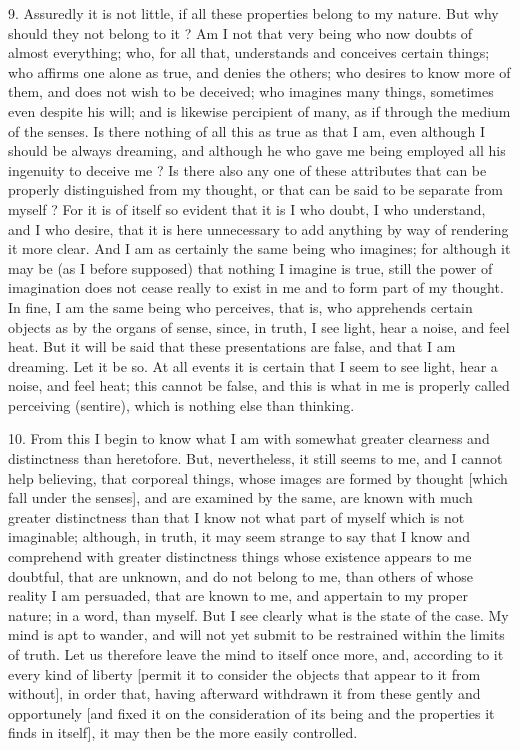 9. Assuredly it is not little, if all these properties belong to my nature. But why should they not belong to it ? Am I not that very being who now doubts of almost everything; who, for all that, understands and conceives certain things; who affirms one alone as true, and denies the others; who desires to know more of them, and does not wish to be deceived; who imagines many things, sometimes even despite his will; and is likewise percipient of many, as if through the medium of the senses. Is there nothing of all this as true as that I am, even although I should be always dreaming, and although he who gave me being employed all his ingenuity to deceive me ? Is there also any one of these attributes that can be properly distinguished from my thought, or that can be said to be separate from myself ? For it is of itself so evident that it is I who doubt, I who understand, and I who desire, that it is here unnecessary to add anything by way of rendering it more clear. And I am as certainly the same being who imagines; for although it may be (as I before supposed) that nothing I imagine is true, still the power of imagination does not cease really to exist in me and to form part of my thought. In fine, I am the same being who perceives, that is, who apprehends certain objects as by the organs of sense, since, in truth, I see light, hear a noise, and feel heat. But it will be said that these presentations are false, and that I am dreaming. Let it be so. At all events it is certain that I seem to see light, hear a noise, and feel heat; this cannot be false, and this is what in me is properly called perceiving (sentire), which is nothing else than thinking.

10. From this I begin to know what I am with somewhat greater clearness and distinctness than heretofore. But, nevertheless, it still seems to me, and I cannot help believing, that corporeal things, whose images are formed by thought [which fall under the senses], and are examined by the same, are known with much greater distinctness than that I know not what part of myself which is not imaginable; although, in truth, it may seem strange to say that I know and comprehend with greater distinctness things whose existence appears to me doubtful, that are unknown, and do not belong to me, than others of whose reality I am persuaded, that are known to me, and appertain to my proper nature; in a word, than myself. But I see clearly what is the state of the case. My mind is apt to wander, and will not yet submit to be restrained within the limits of truth. Let us therefore leave the mind to itself once more, and, according to it every kind of liberty [permit it to consider the objects that appear to it from without], in order that, having afterward withdrawn it from these gently and opportunely [and fixed it on the consideration of its being and the properties it finds in itself], it may then be the more easily controlled.

